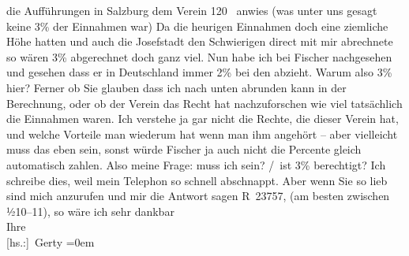 \begin{ledgroupsized}[t]{13cm}
                    die Aufführungen in Salzburg dem Verein
                        120 \label{K_L02525_1v}\label{K_L02525_1h} anwies (was unter uns gesagt keine 3{\%} der Einnahmen war) Da die heurigen Einnahmen doch
                    eine ziemliche Höhe hatten und auch die Josefstadt den Schwierigen direct
                    mit mir abrechnete so wären 3{\%}{ } abgerechnet doch ganz
                    viel.\pend
           \pstart
           Nun habe ich bei Fischer nachgesehen und gesehen
                    dass er in Deutschland immer 2{\%} bei den \label{T_L02525_1v}\label{T_L02525_1h} abzieht. Warum also 3{\%} hier? Ferner ob Sie glauben dass ich nach unten
                    abrunden kann in der Berechnung, oder ob der Verein das Recht hat nachzuforschen wie viel tatsächlich
                    die Einnahmen waren. Ich verstehe ja gar nicht die Rechte, die dieser Verein hat, und welche
                    Vorteile man wiederum hat wenn man ihm angehört – aber vielleicht muss das eben
                    sein, sonst würde Fischer ja auch nicht die Percente gleich automatisch
                    zahlen.\pend
           \pstart
           Also meine Frage: muss ich  sein?\pend
           / ist 3{\%} berechtigt?\pend
           \pstart
           Ich schreibe dies, weil mein Telephon so schnell abschnappt. Aber wenn Sie so
                    lieb sind mich anzurufen und mir die Antwort sagen R 23757, (am besten zwischen
                        ½10–11), so wäre ich sehr dankbar\pend
           \pstart
           \label{T_L02525_2v}\label{T_L02525_2h}{\\[\baselineskip]}Ihre{\\[\baselineskip]}\spacefill\mbox{{[}hs.:{]} Gerty}\pend
           \leftskip=0em{}\endnumbering{}\end{ledgroupsized}  \newcommand{\dateiname}{L02525}\newcommand{\titel}{Gerty von Hofmannsthal an Arthur Schnitzler, 23. 11. 1929}\newcommand{\editorInnen}{Martin Anton Müller und Gerd-Hermann Susen}
            \footnotesize
\begin{ledgroupsized}[t]{11.5cm}
\end{ledgroupsized}
         
      